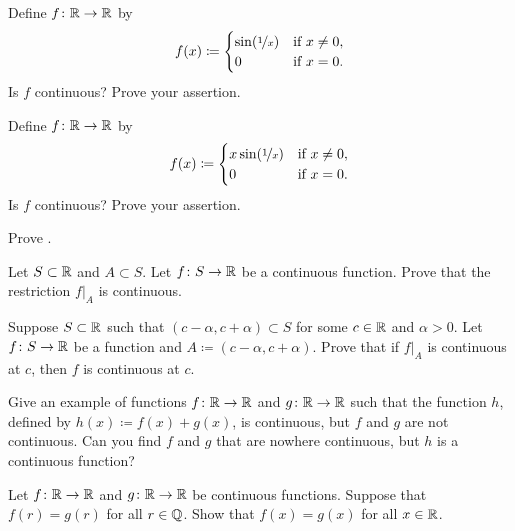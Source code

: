 \begin{exercise}
Define $f \colon {\mathbb{R}} \to {\mathbb{R}}$ by
\begin{equation*}
f(x) \coloneqq
\begin{cases}
\sin(\nicefrac{1}{x}) & \text{if } x \neq 0, \\
0 & \text{if } x=0.
\end{cases}
\avoidbreak
\end{equation*}
Is $f$ continuous?  Prove your assertion.
\end{exercise}

\begin{exercise}
Define $f \colon {\mathbb{R}} \to {\mathbb{R}}$ by
\begin{equation*}
f(x) \coloneqq
\begin{cases}
x \sin(\nicefrac{1}{x}) & \text{if } x \neq 0, \\
0 & \text{if } x=0.
\end{cases}
\avoidbreak
\end{equation*}
Is $f$ continuous?  Prove your assertion.
\end{exercise}

\begin{exercise}
Prove .
\end{exercise}

\begin{exercise} \label{exercise:restrictioncontinuous}
Let $S \subset {\mathbb{R}}$ and $A \subset S$.  Let $f \colon S \to {\mathbb{R}}$
be a continuous function.
Prove that the restriction $f|_A$ is continuous.
\end{exercise}

\begin{exercise}
Suppose $S \subset {\mathbb{R}}$ such that $(c-\alpha,c+\alpha) \subset S$ for some $c \in {\mathbb{R}}$
and $\alpha > 0$.
Let $f \colon S \to {\mathbb{R}}$ be a function and $A \coloneqq (c-\alpha,c+\alpha)$.  Prove that
if $f|_A$ is continuous at $c$, then $f$ is continuous at $c$.
\end{exercise}

\begin{exercise}
Give an example of functions $f \colon {\mathbb{R}} \to {\mathbb{R}}$ and $g \colon {\mathbb{R}} \to {\mathbb{R}}$
such that the function $h$, defined by $h(x) \coloneqq f(x) + g(x)$, is continuous,
but $f$ and $g$ are not continuous.  Can you find $f$ and $g$ that are nowhere
continuous, but $h$ is a continuous function?
\end{exercise}

\begin{exercise}
Let $f \colon {\mathbb{R}} \to {\mathbb{R}}$ and 
$g \colon {\mathbb{R}} \to {\mathbb{R}}$ be continuous functions.  Suppose that
$f(r) = g(r)$ for all $r \in {\mathbb{Q}}$.
Show that $f(x) = g(x)$ for all $x \in {\mathbb{R}}$.
\end{exercise}

